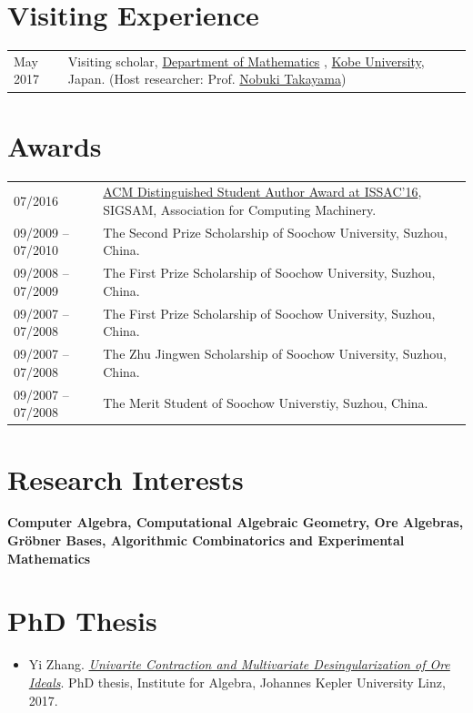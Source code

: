 \documentclass[a4paper,12pt]{article}
\begin{document}
\section*{\Large{Visiting Experience}}

\vspace{.05in}
\begin{tabular}{@{}p{0.8in}p{4.5in}}
May 2017               & Visiting scholar, 
                        \href{http://www.math.kobe-u.ac.jp/}{Department of Mathematics} ,
                        \href{http://www.kobe-u.ac.jp/en/}{Kobe University}, Japan. 
                        (Host researcher: Prof. \href{http://www.math.kobe-u.ac.jp/home-j/takayama-e.html}{Nobuki Takayama})\\
\end{tabular}

\section*{\Large{Awards}}

\begin{tabular}{@{}p{1.4in}p{4in}}
07/2016               & \href{https://www.sigsam.org/Awards/ISSACAwards.html}{ACM Distinguished Student Author Award at ISSAC'16}, SIGSAM, Association for Computing Machinery. \\
09/2009 -- 07/2010    & The Second Prize Scholarship of Soochow University, Suzhou, China.\\
09/2008 -- 07/2009    & The First Prize Scholarship of Soochow University, Suzhou, China. \\
09/2007 -- 07/2008    & The First Prize Scholarship of Soochow University, Suzhou, China. \\ 
09/2007 -- 07/2008    & The Zhu Jingwen Scholarship of Soochow University, Suzhou, China. \\
09/2007 -- 07/2008    & The Merit Student of Soochow Universtiy, Suzhou, China. 
\end{tabular}

\section*{\Large{Research Interests}}
{\bf Computer Algebra, Computational Algebraic Geometry, Ore Algebras, Gr\"{o}bner Bases, Algorithmic Combinatorics and Experimental Mathematics}

\section*{\Large{PhD Thesis}}
\begin{itemize}
 \item Yi Zhang. \href{https://yzhang1616.github.io/yzhang_PhDthesis_final.pdf}{{\em Univarite Contraction and Multivariate Desingularization of Ore Ideals}}. 
                PhD thesis, Institute for Algebra, Johannes Kepler University Linz, 2017.
\end{itemize}
\end{document}
